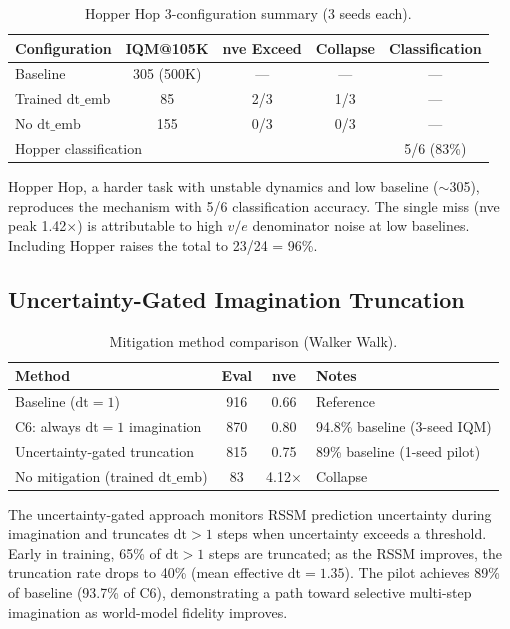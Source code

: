 \documentclass[10pt,letterpaper]{article}
\newcommand{\dt}{\mathrm{dt}}
\begin{document}
\begin{table}[h]
\centering
\caption{Hopper Hop 3-configuration summary (3 seeds each).}
\label{tab:hopper}
\begin{tabular}{lcccc}
\toprule
Configuration & IQM@105K & nve Exceed & Collapse & Classification \\
\midrule
Baseline & 305 (500K) & --- & --- & --- \\
Trained $\dt\_\text{emb}$ & 85 & 2/3 & 1/3 & --- \\
No $\dt\_\text{emb}$ & 155 & 0/3 & 0/3 & --- \\
\midrule
\multicolumn{4}{l}{Hopper classification} & 5/6 (83\%) \\
\bottomrule
\end{tabular}
\end{table}

Hopper Hop, a harder task with unstable dynamics and low baseline ($\sim$305), reproduces the mechanism with 5/6 classification accuracy.
The single miss (nve peak 1.42$\times$) is attributable to high $v/e$ denominator noise at low baselines.
Including Hopper raises the total to 23/24 = 96\%.

\subsection{Uncertainty-Gated Imagination Truncation}
\label{sec:uncertainty}

\begin{table}[h]
\centering
\caption{Mitigation method comparison (Walker Walk).}
\label{tab:mitigation_comparison}
\begin{tabular}{lccl}
\toprule
Method & Eval & nve & Notes \\
\midrule
Baseline ($\dt=1$) & 916 & 0.66 & Reference \\
C6: always $\dt=1$ imagination & 870 & 0.80 & 94.8\% baseline (3-seed IQM) \\
Uncertainty-gated truncation & 815 & 0.75 & 89\% baseline (1-seed pilot) \\
No mitigation (trained $\dt\_\text{emb}$) & 83 & 4.12$\times$ & Collapse \\
\bottomrule
\end{tabular}
\end{table}

The uncertainty-gated approach monitors RSSM prediction uncertainty during imagination and truncates $\dt > 1$ steps when uncertainty exceeds a threshold.
Early in training, 65\% of $\dt > 1$ steps are truncated; as the RSSM improves, the truncation rate drops to 40\% (mean effective $\dt = 1.35$).
The pilot achieves 89\% of baseline (93.7\% of C6), demonstrating a path toward selective multi-step imagination as world-model fidelity improves.
\end{document}

